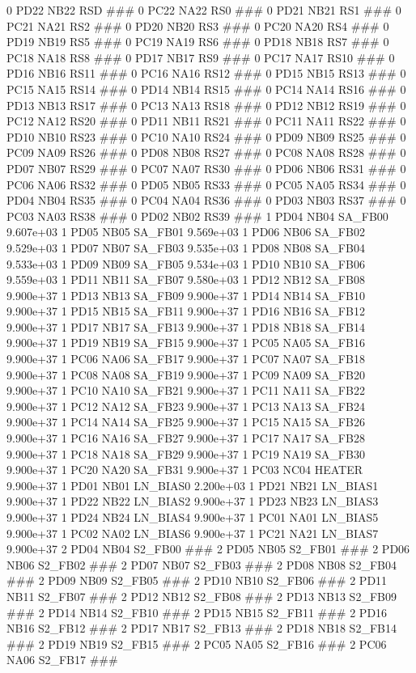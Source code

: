 0 PD22 NB22 RSD ### 
0 PC22 NA22 RS0 ### 
0 PD21 NB21 RS1 ### 
0 PC21 NA21 RS2 ### 
0 PD20 NB20 RS3 ### 
0 PC20 NA20 RS4 ### 
0 PD19 NB19 RS5 ### 
0 PC19 NA19 RS6 ### 
0 PD18 NB18 RS7 ### 
0 PC18 NA18 RS8 ### 
0 PD17 NB17 RS9 ### 
0 PC17 NA17 RS10 ### 
0 PD16 NB16 RS11 ### 
0 PC16 NA16 RS12 ### 
0 PD15 NB15 RS13 ### 
0 PC15 NA15 RS14 ### 
0 PD14 NB14 RS15 ### 
0 PC14 NA14 RS16 ### 
0 PD13 NB13 RS17 ### 
0 PC13 NA13 RS18 ### 
0 PD12 NB12 RS19 ### 
0 PC12 NA12 RS20 ### 
0 PD11 NB11 RS21 ### 
0 PC11 NA11 RS22 ### 
0 PD10 NB10 RS23 ### 
0 PC10 NA10 RS24 ### 
0 PD09 NB09 RS25 ### 
0 PC09 NA09 RS26 ### 
0 PD08 NB08 RS27 ### 
0 PC08 NA08 RS28 ### 
0 PD07 NB07 RS29 ### 
0 PC07 NA07 RS30 ### 
0 PD06 NB06 RS31 ### 
0 PC06 NA06 RS32 ### 
0 PD05 NB05 RS33 ### 
0 PC05 NA05 RS34 ### 
0 PD04 NB04 RS35 ### 
0 PC04 NA04 RS36 ### 
0 PD03 NB03 RS37 ### 
0 PC03 NA03 RS38 ### 
0 PD02 NB02 RS39 ### 
1 PD04 NB04 SA_FB00 9.607e+03 
1 PD05 NB05 SA_FB01 9.569e+03 
1 PD06 NB06 SA_FB02 9.529e+03 
1 PD07 NB07 SA_FB03 9.535e+03 
1 PD08 NB08 SA_FB04 9.533e+03 
1 PD09 NB09 SA_FB05 9.534e+03 
1 PD10 NB10 SA_FB06 9.559e+03 
1 PD11 NB11 SA_FB07 9.580e+03 
1 PD12 NB12 SA_FB08 9.900e+37 
1 PD13 NB13 SA_FB09 9.900e+37 
1 PD14 NB14 SA_FB10 9.900e+37 
1 PD15 NB15 SA_FB11 9.900e+37 
1 PD16 NB16 SA_FB12 9.900e+37 
1 PD17 NB17 SA_FB13 9.900e+37 
1 PD18 NB18 SA_FB14 9.900e+37 
1 PD19 NB19 SA_FB15 9.900e+37 
1 PC05 NA05 SA_FB16 9.900e+37 
1 PC06 NA06 SA_FB17 9.900e+37 
1 PC07 NA07 SA_FB18 9.900e+37 
1 PC08 NA08 SA_FB19 9.900e+37 
1 PC09 NA09 SA_FB20 9.900e+37 
1 PC10 NA10 SA_FB21 9.900e+37 
1 PC11 NA11 SA_FB22 9.900e+37 
1 PC12 NA12 SA_FB23 9.900e+37 
1 PC13 NA13 SA_FB24 9.900e+37 
1 PC14 NA14 SA_FB25 9.900e+37 
1 PC15 NA15 SA_FB26 9.900e+37 
1 PC16 NA16 SA_FB27 9.900e+37 
1 PC17 NA17 SA_FB28 9.900e+37 
1 PC18 NA18 SA_FB29 9.900e+37 
1 PC19 NA19 SA_FB30 9.900e+37 
1 PC20 NA20 SA_FB31 9.900e+37 
1 PC03 NC04 HEATER 9.900e+37 
1 PD01 NB01 LN_BIAS0 2.200e+03 
1 PD21 NB21 LN_BIAS1 9.900e+37 
1 PD22 NB22 LN_BIAS2 9.900e+37 
1 PD23 NB23 LN_BIAS3 9.900e+37 
1 PD24 NB24 LN_BIAS4 9.900e+37 
1 PC01 NA01 LN_BIAS5 9.900e+37 
1 PC02 NA02 LN_BIAS6 9.900e+37 
1 PC21 NA21 LN_BIAS7 9.900e+37 
2 PD04 NB04 S2_FB00 ### 
2 PD05 NB05 S2_FB01 ### 
2 PD06 NB06 S2_FB02 ### 
2 PD07 NB07 S2_FB03 ### 
2 PD08 NB08 S2_FB04 ### 
2 PD09 NB09 S2_FB05 ### 
2 PD10 NB10 S2_FB06 ### 
2 PD11 NB11 S2_FB07 ### 
2 PD12 NB12 S2_FB08 ### 
2 PD13 NB13 S2_FB09 ### 
2 PD14 NB14 S2_FB10 ### 
2 PD15 NB15 S2_FB11 ### 
2 PD16 NB16 S2_FB12 ### 
2 PD17 NB17 S2_FB13 ### 
2 PD18 NB18 S2_FB14 ### 
2 PD19 NB19 S2_FB15 ### 
2 PC05 NA05 S2_FB16 ### 
2 PC06 NA06 S2_FB17 ### 
